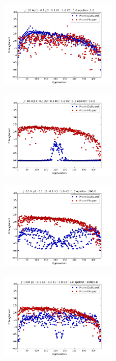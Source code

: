\begin{figure}[p]
\centering
\includegraphics[width=0.5\textwidth]{Figures/epsilon_1.png}
\end{figure}

\begin{figure}[p]
\centering
\includegraphics[width=0.5\textwidth]{Figures/epsilon_10.png}
\end{figure}

\begin{figure}[p]
\centering
\includegraphics[width=0.5\textwidth]{Figures/epsilon_100.png}
\end{figure}

\begin{figure}[p]
\centering
\includegraphics[width=0.5\textwidth]{Figures/epsilon_10000.png}
\end{figure}

